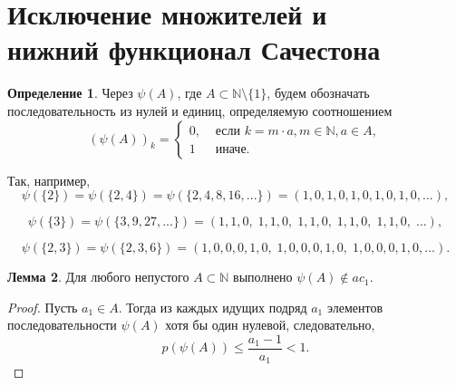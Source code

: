 \documentclass[a4paper,openbib]{article}
\renewcommand{\leq}{\leqslant}
\theoremstyle{definition}
\newtheorem{lemma}{Лемма}[section]
\newtheorem{definition}[lemma]{Определение}
\begin{document}


\section{Исключение множителей и \\  нижний функционал Сачестона}



\begin{definition}
	Через $\psi(A)$, где $A\subset\mathbb{N}\setminus\{1\}$,
	будем обозначать последовательность из нулей и единиц,
	определяемую соотношением
	\begin{equation}
		(\psi(A))_k = \begin{cases}
			0, & \mbox{~если~} k = m\cdot a, m \in \mathbb{N}, a\in A,
			\\
			1  & \mbox{~иначе.}
		\end{cases}
	\end{equation}
\end{definition}

Так, например,
\begin{equation}
	\psi(\{2\}) = \psi(\{2, 4\}) = \psi(\{2,4,8,16,...\}) = (1,0,1,0,1,0,1,0,1,0,...),
\end{equation}

\begin{equation}
	\psi(\{3\}) = \psi(\{3,9,27,...\}) = (1,1,0,\;1,1,0,\;1,1,0,\;1,1,0,\;1,1,0,\;...),
\end{equation}

\begin{equation}
	\psi(\{2,3\}) = \psi(\{2,3,6\}) = (1,0,0,0,1,0,\;1,0,0,0,1,0,\;1,0,0,0,1,0,...).
\end{equation}


\begin{lemma}
	Для любого непустого $A\subset \mathbb{N} $ выполнено $\psi(A) \notin ac_1$.
\end{lemma}
\begin{proof}
	Пусть $a_1\in A$.
	Тогда из каждых идущих подряд $a_1$ элементов последовательности $\psi(A)$
	хотя бы один нулевой,
	следовательно,
	\begin{equation}
		p(\psi(A)) \leq \frac{a_1-1}{a_1} < 1
		.
	\end{equation}
\end{proof}
\end{document}
